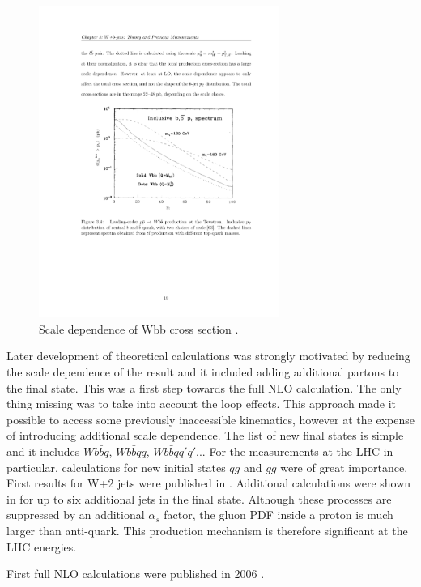 \begin{figure}[htbp]
	\centering
		\includegraphics[width=0.7\textwidth]{Figures/scale_dep.pdf}
	\caption[Scale dependence of Wbb cross section]{Scale dependence of Wbb cross section \cite{Mangano:1992kp}.}
	\label{fig:scale_dep}
\end{figure}
\par Later development of theoretical calculations was strongly motivated by reducing the scale dependence of the result and it included adding additional partons to the final state. This was a first step towards the full NLO calculation. The only thing missing was to take into account the loop effects. This approach made it possible to access some previously inaccessible kinematics, however at the expense of introducing additional scale dependence. The list of new final states is simple and it includes $Wb\bar{b}q$, $Wb\bar{b}q\bar{q}$, $Wb\bar{b}\bar{q}q'\bar{q'}$... For the measurements at the LHC in particular, calculations for new initial states $qg$ and $gg$ were of great importance. First results for W+2 jets were published in \cite{Ellis:1998fv}. Additional calculations were shown in \cite{Mangano:2001xp} for up to six additional jets in the final state. Although these processes are suppressed by an additional $\alpha_s$ factor, the gluon PDF inside a proton is much larger than anti-quark. This production mechanism is therefore significant at the LHC energies. 
\par First full NLO calculations were published in 2006 \cite{FebresCordero:2006sj}. 
